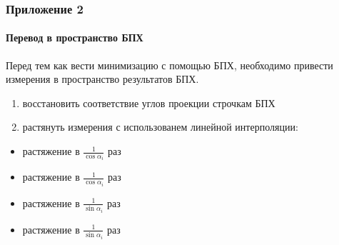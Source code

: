 \documentclass[12pt]{beamer}
\newcommand{\rom}[1]{%
  \textup{\uppercase\expandafter{\romannumeral#1}}%
}
\begin{document}
\begin{frame}
\frametitle{Приложение 2}
\framesubtitle{Перевод в пространство БПХ}

Перед тем как вести минимизацию с помощью БПХ, необходимо привести измерения в пространство результатов БПХ.
\begin{enumerate}
  \item восстановить соответствие углов проекции строчкам БПХ
  \item растянуть измерения с использованем линейной интерполяции:
\end{enumerate}

\hspace*{2cm}
  \begin{itemize}
    \item \rom{1} растяжение в $\frac 1 {\cos \alpha_i}$ раз
    \item \rom{2} растяжение в $\frac 1 {\cos \alpha_i}$ раз
    \item \rom{3} растяжение в $\frac 1 {\sin \alpha_i}$ раз
    \item \rom{4} растяжение в $\frac 1 {\sin \alpha_i}$ раз
  \end{itemize}

\end{frame}
\end{document}
